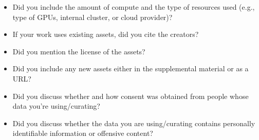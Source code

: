 \begin{itemize}
    
    \item
    Did you include the amount of compute and the type of resources used (e.g., type of GPUs, internal cluster, or cloud provider)?
    
    \answerTODO{}
    
    \item
    If your work uses existing assets, did you cite the creators?
    
    \answerTODO{}
    
    \item
    Did you mention the license of the assets?
    
    \answerTODO{}
    
    \item
    Did you include any new assets either in the supplemental material or as a URL?
    
    \answerTODO{}
    
    \item
    Did you discuss whether and how consent was obtained from people whose data you're using/curating?
    
    
    \item
    Did you discuss whether the data you are using/curating contains personally identifiable information or offensive content?
    
\end{itemize}